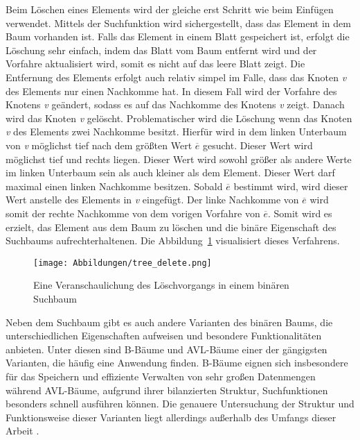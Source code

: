 Beim Löschen eines Elements wird der gleiche erst Schritt wie beim Einfügen verwendet. Mittels der Suchfunktion wird sichergestellt, dass das Element in dem Baum vorhanden ist. Falls das Element in einem Blatt gespeichert ist, erfolgt die Löschung sehr einfach, indem das Blatt vom Baum entfernt wird und der Vorfahre aktualisiert wird, somit es nicht auf das leere Blatt zeigt. Die Entfernung des Elements erfolgt auch relativ simpel im Falle, dass das Knoten \textit{v} des Elements nur einen Nachkomme hat. In diesem Fall wird der Vorfahre des Knotens \textit{v} geändert, sodass es auf das Nachkomme des Knotens \textit{v} zeigt. Danach wird das Knoten \textit{v} gelöscht. Problematischer wird die Löschung wenn das Knoten \textit{v} des Elements zwei Nachkomme besitzt. Hierfür wird in dem linken Unterbaum von \textit{v} möglichst tief nach dem größten Wert \textit{$\overline{e}$} gesucht. Dieser Wert wird möglichst tief und rechts liegen. Dieser Wert wird sowohl größer als andere Werte im linken Unterbaum sein als auch kleiner als dem Element. Dieser Wert darf maximal einen linken Nachkomme besitzen. Sobald \textit{$\overline{e}$} bestimmt wird, wird dieser Wert anstelle des Elements in \textit{v} eingefügt. Der linke Nachkomme von \textit{$\overline{e}$} wird somit der rechte Nachkomme von dem vorigen Vorfahre von \textit{$\overline{e}$}. Somit wird es erzielt, das Element aus dem Baum zu löschen und die binäre Eigenschaft des Suchbaums aufrechterhaltenen. Die Abbildung~\ref{fig: tree_delete} visualisiert dieses Verfahrens. \autocite[140-141]{knebl_algorithmen_2021}

\begin{figure}[!b]
	\texttt{[image: Abbildungen/tree\_delete.png]}
	\centering
	\caption{Eine Veranschaulichung des Löschvorgangs in einem binären Suchbaum \autocite[140]{knebl_algorithmen_2021}}
	\label{fig: tree_delete}
\end{figure}

Neben dem Suchbaum gibt es auch andere Varianten des binären Baums, die unterschiedlichen Eigenschaften aufweisen und besondere Funktionalitäten anbieten. Unter diesen sind B-Bäume und AVL-Bäume einer der gängigsten Varianten, die häufig eine Anwendung finden. B-Bäume eignen sich insbesondere für das Speichern und effiziente Verwalten von sehr großen Datenmengen während AVL-Bäume, aufgrund ihrer bilanzierten Struktur, Suchfunktionen besonders schnell ausführen können. Die genauere Untersuchung der Struktur und Funktionsweise dieser Varianten liegt allerdings außerhalb des Umfangs dieser Arbeit \autocite[407-412]{gumm_band_2016}.


